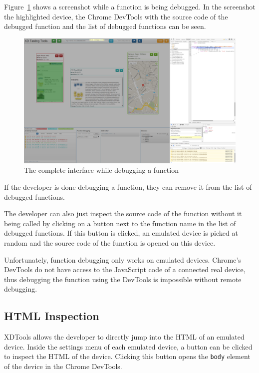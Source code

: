 Figure~\ref{fig:function_debugging_complete} shows a screenshot while a function is being debugged. In the screenshot the highlighted device, the Chrome DevTools with the source code of the debugged function and the list of debugged functions can be seen.

\begin{figure}[H]
  \centering
    \includegraphics[width=1.0\textwidth]{images/screenshots/function_debugging_complete.png}
	\caption[Screenshot: Function debugging]{The complete interface while debugging a function}
	\label{fig:function_debugging_complete}
\end{figure}

If the developer is done debugging a function, they can remove it from the list of debugged functions.

The developer can also just inspect the source code of the function without it being called by clicking on a button next to the function name in the list of debugged functions. If this button is clicked, an emulated device is picked at random and the source code of the function is opened on this device. 

Unfortunately, function debugging only works on emulated devices. Chrome's DevTools do not have access to the JavaScript code of a connected real device, thus debugging the function using the DevTools is impossible without remote debugging.

\subsection{HTML Inspection}

XDTools allows the developer to directly jump into the HTML of an emulated device. Inside the settings menu of each emulated device, a button can be clicked to inspect the HTML of the device. Clicking this button opens the \lstinline|body| element of the device in the Chrome DevTools. 

